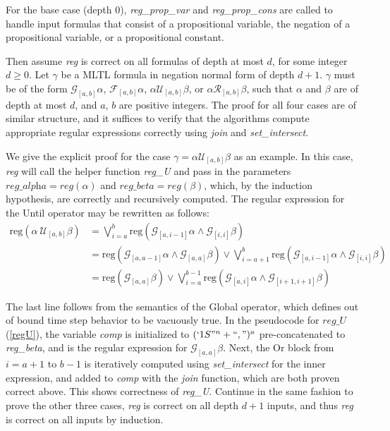 \documentclass[runningheads]{llncs}
\begin{document}
For the base case (depth $0$), \textit{reg\_prop\_var} and \textit{reg\_prop\_cons} are called to handle input formulas that consist of a propositional variable, the negation of a propositional variable, or a propositional constant.

Then assume \textit{reg} is correct on all formulas of depth at most $d$, for some integer $d \geq 0$. Let $\gamma$ be a MLTL formula in negation normal form of depth $d + 1$. $\gamma$ must be of the form $\mathcal{G}_{[a,b]}\alpha$, $\mathcal{F}_{[a,b]}\alpha$, $\alpha \mathcal{U}_{[a,b]} \beta$, or $\alpha \mathcal{R}_{[a,b]} \beta$, such that $\alpha$ and $\beta$ are of depth at most $d$, and $a$, $b$ are positive integers. The proof for all four cases are of similar structure, and it suffices to verify that the algorithms compute appropriate regular expressions correctly using \textit{join} and \textit{set\_intersect}.

We give the explicit proof for the case $\gamma = \alpha \mathcal{U}_{[a,b]} \beta$ as an example.
In this case, \textit{reg} will call the helper function \textit{reg\_U} and pass in the parameters $\textit{reg\_alpha} = \textit{reg}(\alpha)$ and $\textit{reg\_beta} = \textit{reg}(\beta)$, which, by the induction hypothesis, are correctly and recursively computed.
The regular expression for the Until operator may be rewritten as follows: 
\begin{align*}
   \text{reg}(\alpha \ \mathcal{U}_{[a,b]} \beta) &=  \bigvee_{i=a}^{b} \text{reg}\left(\mathcal{G}_{[a,i-1]}\alpha \land \mathcal{G}_{[i, i]} \beta\right) \\
   &= \text{reg}\left(\mathcal{G}_{[a,a-1]}\alpha \land \mathcal{G}_{[a, a]} \beta\right) \lor \bigvee_{i=a+1}^{b} \text{reg}\left(\mathcal{G}_{[a,i-1]}\alpha \land \mathcal{G}_{[i, i]} \beta\right) \\
   &= \text{reg}\left(\mathcal{G}_{[a, a]} \beta \right)\lor \bigvee_{i=a}^{b-1} \text{reg}\left(\mathcal{G}_{[a,i]}\alpha \land \mathcal{G}_{[i+1, i+1]} \beta\right)
\end{align*}

The last line follows from the semantics of the Global operator, which defines out of bound time step behavior to be vacuously true. In the pseudocode for $reg\_U$ (\ref{regU}), the variable \textit{comp} is initialized to $(`1S"^n + ``,")^a$ pre-concatenated to \textit{reg\_beta}, and is the regular expression for $\mathcal{G}_[a, a] \beta$. Next, the Or block from $i = a + 1$ to $b - 1$ is iteratively computed using \textit{set\_intersect} for the inner expression, and added to \textit{comp} with the \textit{join} function, which are both proven correct above. This shows correctness of \textit{reg\_U}.
Continue in the same fashion to prove the other three cases, \textit{reg} is correct on all depth $d+1$ inputs, and thus \textit{reg} is correct on all inputs by induction.
\end{document}
